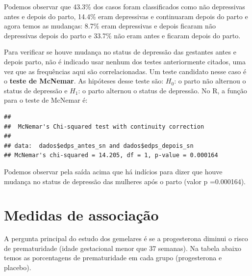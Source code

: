 \documentclass[
]{book}
\newenvironment{Shaded}{\begin{snugshade}}{\end{snugshade}}
\newcommand{\DataTypeTok}[1]{\textcolor[rgb]{0.13,0.29,0.53}{#1}}
\newcommand{\KeywordTok}[1]{\textcolor[rgb]{0.13,0.29,0.53}{\textbf{#1}}}
\newcommand{\NormalTok}[1]{#1}
\newcommand{\OperatorTok}[1]{\textcolor[rgb]{0.81,0.36,0.00}{\textbf{#1}}}
\newcommand{\StringTok}[1]{\textcolor[rgb]{0.31,0.60,0.02}{#1}}
\begin{document}
Podemos observar que 43.3\% dos casos foram classificados como não depressivas antes e depois do parto, 14.4\% eram depressivas e continuaram depois do parto e agora temos as mudanças: 8.7\% eram depressivas e depois ficaram não depressivas depois do parto e 33.7\% não eram antes e ficaram depois do parto.

Para verificar se houve mudança no status de depressão das gestantes antes e depois parto, não é indicado usar nenhum dos testes anteriormente citados, uma vez que as frequências aqui são correlacionadas. Um teste candidato nesse caso é o \textbf{teste de McNemar}. As hipóteses desse teste são: \(H_0\): o parto não alternou o status de depressão e \(H_1\): o parto alternou o status de depressão. No R, a função para o teste de McNemar é:

\begin{Shaded}
\end{Shaded}

\begin{verbatim}
## 
## 	McNemar's Chi-squared test with continuity correction
## 
## data:  dados$edps_antes_sn and dados$edps_depois_sn
## McNemar's chi-squared = 14.205, df = 1, p-value = 0.000164
\end{verbatim}

Podemos observar pela saída acima que há indícios para dizer que houve mudança no status de depressão das mulheres após o parto (valor p =0.000164).

\hypertarget{medidas-de-associauxe7uxe3o}{%
\section{Medidas de associação}\label{medidas-de-associauxe7uxe3o}}

A pergunta principal do estudo dos gemelares é se a progesterona diminui o risco de prematuridade (idade gestacional menor que 37 semanas). Na tabela abaixo temos as porcentagens de prematuridade em cada grupo (progesterona e placebo).

\begin{Shaded}
\end{Shaded}
\end{document}
